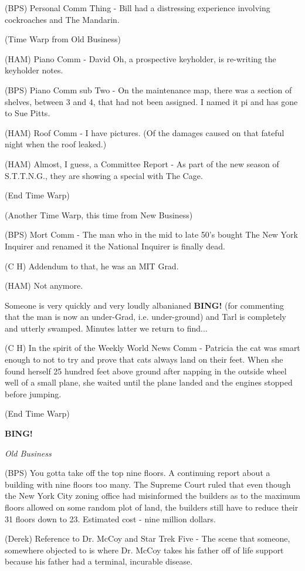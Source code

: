 \documentclass[12pt]{article}
\newcommand{\bing}{{\bf BING!} }
\newcommand{\goto}[1]{\bing \vskip 12pt \centerline{{\em{#1}}}}
\begin{document}
(BPS) Personal Comm Thing - Bill had a distressing experience involving cockroaches and The Mandarin.

(Time Warp from Old Business)

(HAM) Piano Comm - David Oh, a prospective keyholder, is re-writing the keyholder notes.  

(BPS) Piano Comm sub Two - On the maintenance map, there was a section of shelves, between 3 and 4, that had not been assigned. I named it pi and has gone to Sue Pitts.

(HAM) Roof Comm - I have pictures. (Of the damages caused on that fateful night when the roof leaked.)

(HAM) Almost, I guess, a Committee Report - As part of the new season of S.T.T.N.G., they are showing a special with The Cage.

(End Time Warp)

(Another Time Warp, this time from New Business)

(BPS) Mort Comm - The man who in the mid to late 50's bought The New York Inquirer and renamed it the National Inquirer is finally dead.

(C H) Addendum to that, he was an MIT Grad.

(HAM) Not anymore.

Someone is very quickly and very loudly albanianed \bing (for commenting that the man is now an under-Grad, i.e. under-ground) and Tarl is completely and utterly swamped. Minutes latter we return to find...

(C H) In the spirit of the Weekly World News Comm - Patricia the cat was smart enough to not to try and prove that cats always land on their feet. When she found herself 25 hundred feet above ground after napping in the outside wheel well of a small plane, she waited until the plane landed and the engines stopped before jumping.

(End Time Warp)

\goto{Old Business}

(BPS) You gotta take off the top nine floors. A continuing report about a building with nine floors too many. The Supreme Court ruled that even though the New York City zoning office had misinformed the builders as to the maximum floors allowed on some random plot of land, the builders still have to reduce their 31 floors down to 23. Estimated cost - nine million dollars.

(Derek) Reference to Dr. McCoy and Star Trek Five - The scene that someone, somewhere objected to is where Dr. McCoy takes his father off of life support because his father had a terminal, incurable disease.
\end{document}
